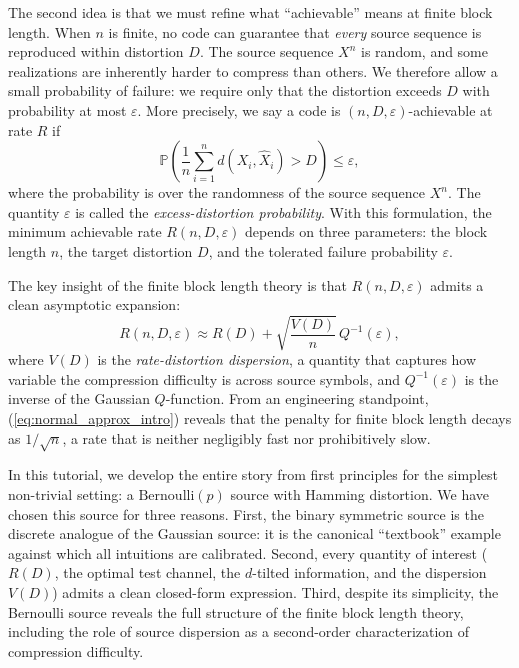 \documentclass[11pt]{article}
\newcommand{\RD}{R(D)}
\newcommand{\Ber}{\mathrm{Bernoulli}}
\newcommand{\Prob}{\mathbb{P}}
\newcommand{\Qinv}{Q^{-1}}
\begin{document}
The second idea is that we must refine what ``achievable'' means at finite
block length.
When $n$ is finite, no code can guarantee that \emph{every} source sequence is
reproduced within distortion $D$.
The source sequence $X^n$ is random, and some realizations are inherently harder
to compress than others.
We therefore allow a small probability of failure: we require only that the
distortion exceeds $D$ with probability at most $\varepsilon$.
More precisely, we say a code is $(n, D, \varepsilon)$-achievable at rate $R$
if
\begin{equation}
\label{eq:excess_distortion_intro}
\Prob\!\left(\frac{1}{n}\sum_{i=1}^{n} d(X_i, \hat{X}_i) > D\right) \leq \varepsilon,
\end{equation}
where the probability is over the randomness of the source sequence $X^n$.
The quantity $\varepsilon$ is called the \emph{excess-distortion probability}.
With this formulation, the minimum achievable rate $R(n, D, \varepsilon)$
depends on three parameters: the block length $n$, the target distortion $D$,
and the tolerated failure probability $\varepsilon$.

The key insight of the finite block length theory is that $R(n, D, \varepsilon)$
admits a clean asymptotic expansion:
\begin{equation}
\label{eq:normal_approx_intro}
R(n, D, \varepsilon) \approx \RD + \sqrt{\frac{V(D)}{n}}\, \Qinv(\varepsilon),
\end{equation}
where $V(D)$ is the \emph{rate-distortion dispersion}, a quantity that captures
how variable the compression difficulty is across source symbols, and
$\Qinv(\varepsilon)$ is the inverse of the Gaussian $Q$-function.
From an engineering standpoint, (\ref{eq:normal_approx_intro}) reveals that the
penalty for finite block length decays as $1/\sqrt{n}$, a rate that is neither
negligibly fast nor prohibitively slow.

In this tutorial, we develop the entire story from first principles for the simplest
non-trivial setting: a $\Ber(p)$ source with Hamming distortion.
We have chosen this source for three reasons.
First, the binary symmetric source is the discrete analogue of the Gaussian source:
it is the canonical ``textbook'' example against which all intuitions are calibrated.
Second, every quantity of interest ($\RD$, the optimal test channel, the $d$-tilted
information, and the dispersion $V(D)$) admits a clean closed-form expression.
Third, despite its simplicity, the Bernoulli source reveals the full structure of
the finite block length theory, including the role of source dispersion as a
second-order characterization of compression difficulty.
\end{document}
